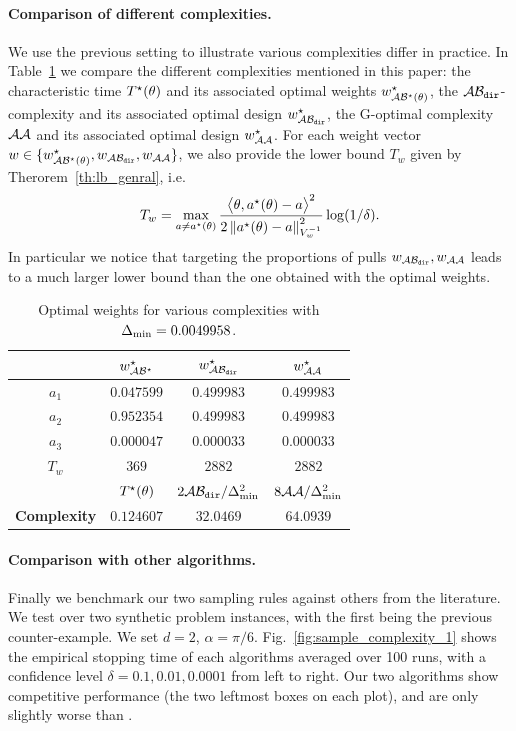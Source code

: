 \paragraph{Comparison of different complexities.}
We use the previous setting to illustrate various complexities differ in practice. In Table~\ref{table:optimal_weights} we compare the different complexities mentioned in this paper: the characteristic time $T^{\star}(\theta)$ and its associated optimal weights $w^\star_{\mathcal{A}\mathcal{B}^\star(\theta)}$, the $\mathcal{A}\mathcal{B}_{\texttt{dir}}$-complexity and its associated optimal design $w^\star_{\mathcal{A}\mathcal{B}_{\texttt{dir}}}$, the G-optimal complexity $\mathcal{A}\mathcal{A}$ and its associated optimal design $w^\star_{\mathcal{A}\mathcal{A}}$. For each weight vector $w \in\{w^\star_{\mathcal{A}\mathcal{B}^\star(\theta)},w_{\mathcal{A}\mathcal{B}_{\texttt{dir}}}, w_{\mathcal{A}\mathcal{A}}\}$,
 we also provide the lower bound $T_w$ given by Therorem~\ref{th:lb_genral}, i.e.
 \[
 T_w = \max_{a\neq a^\star(\theta)} \frac{\big\langle \theta, a^\star(\theta)-a\big\rangle^2}{2\left\lVert a^\star(\theta)-a\right\rVert_{V_w^{-1}}^2} \log(1/\delta).
\]
In particular we notice that targeting the proportions of pulls $w_{\mathcal{A}\mathcal{B}_{\texttt{dir}}}, w_{\mathcal{A}\mathcal{A}}$ leads to a much larger lower bound than the one obtained with the optimal weights.
\begin{table}[th]
\centering
\begin{tabular}{|c|c|c|c|}
 \hline
   & $w^\star_{\mathcal{A}\mathcal{B}^\star}$ & $w^\star_{\mathcal{A}\mathcal{B}_{\texttt{dir}}}$  & $w^\star_{\mathcal{A}\mathcal{A}}$   \\
 \hline
 \textbf{$a_1$} & $0.047599$ & $0.499983$ & $0.499983$ \\
 \hline
 \textbf{$a_2$} & $0.952354$ & $0.499983$ & $0.499983$ \\
 \hline
 \textbf{$a_3$} & $0.000047$ & $0.000033$ & $0.000033$ \\
 \hline
 \textbf{$T_w$} & $369$ & $2882$ & $2882$ \\
 \hline
   & $T^{\star}(\theta)$ & $2\mathcal{A}\mathcal{B}_{\texttt{dir}}/\Delta_\text{min}^2$ & $8\mathcal{A}\mathcal{A}/\Delta_\text{min}^2$\\
 \hline
  \textbf{Complexity} & $0.124607$ & $32.0469$ & $64.0939$ \\
 \hline
\end{tabular}
\caption{Optimal weights for various complexities with $\Delta_\text{min}= 0.0049958$.}
\label{table:optimal_weights}
\end{table}

\paragraph{Comparison with other algorithms.}
Finally we benchmark our two sampling rules against others from the literature. %
We test over two synthetic problem instances, with the first being the previous counter-example. We set $d=2$, $\alpha=\pi/6$. Fig.~\ref{fig:sample_complexity_1} shows the empirical stopping time of each algorithms averaged over 100 runs, with a confidence level $\delta=0.1, 0.01, 0.0001$ from left to right. Our two algorithms show competitive performance (the two leftmost boxes on each plot), and are only slightly worse than \LGapE.

